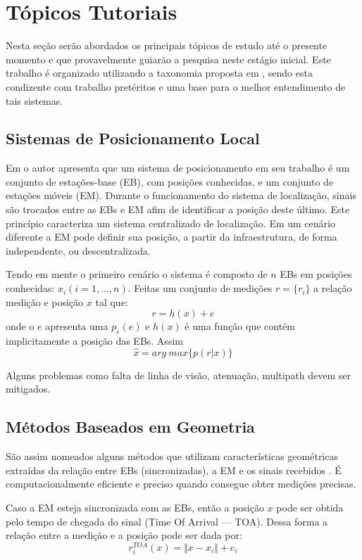 \section{Tópicos Tutoriais}\label{topics}

Nesta seção serão abordados os principais tópicos de estudo até o presente momento e que provavelmente guiarão a pesquisa neste estágio inicial. Este trabalho é organizado utilizando a taxonomia proposta em \cite{Seco2009}, sendo esta condizente com trabalho pretéritos e uma base para o melhor entendimento de tais sistemas.

\subsection{Sistemas de Posicionamento Local}
Em \cite{Seco2009} o autor apresenta que um sistema de posicionamento em seu trabalho é um conjunto de estações-base (EB), com posições conhecidas, e um conjunto de estações móveis (EM). Durante o funcionamento do sistema de localização, sinais são trocados entre as EBs e EM afim de identificar a posição deste último. Este princípio caracteriza um sistema centralizado de localização. Em um cenário diferente a EM pode definir sua posição, a partir da infraestrutura, de forma independente, ou descentralizada.

Tendo em mente o primeiro cenário o sistema é composto de $n$ EBs em posições conhecidas: $x_i(i=1,\dots,n)$. Feitas um conjunto de medições $r=\lbrace r_i\rbrace$ a relação medição e posição $x$ tal que: $$r=h(x)+e$$ onde o $e$ apresenta uma $p_e(e)$ e $h(x)$ é uma função que contém implicitamente a posição das EBs. Assim $$\widehat{x}=arg\ max\lbrace p(r|x)\rbrace$$

Alguns problemas como falta de linha de visão, atenuação, multipath devem ser mitigados.

\subsection{Métodos Baseados em Geometria}
São assim nomeados alguns métodos que utilizam características geométricas extraídas da relação entre EBs (sincronizadas), a EM e os sinais recebidos \cite{Gustafsson2005}. É computacionalmente eficiente e preciso quando consegue obter medições precisas.

Caso a EM esteja sincronizada com as EBs, então a posição $x$ pode ser obtida pelo tempo de chegada do sinal (Time Of Arrival --- TOA). Dessa forma a relação entre a medição e a posição pode ser dada por: $$r_{i}^{TOA}(x)=\Vert x-x_{i}\Vert + e_{i}$$

